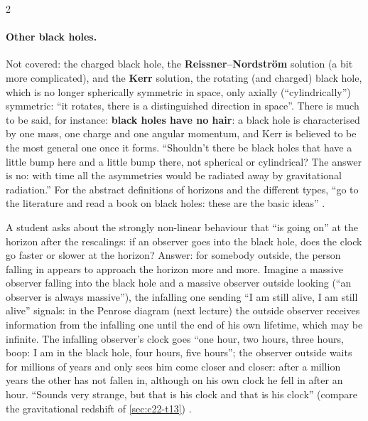 \begin{paracol}{2}
\paragraph{Other black holes.} Not covered: the charged black hole, the \textbf{Reissner--Nordstr\"om} solution (a bit more complicated), and the \textbf{Kerr} solution, the rotating (and charged) black hole, which is no longer spherically symmetric in space, only axially (``cylindrically'') symmetric: ``it rotates, there is a distinguished direction in space''. There is much to be said, for instance: \textbf{black holes have no hair}: a black hole is characterised by one mass, one charge and one angular momentum, and Kerr is believed to be the most general one once it forms. ``Shouldn't there be black holes that have a little bump here and a little bump there, not spherical or cylindrical? The answer is no: with time all the asymmetries would be radiated away by gravitational radiation.'' For the abstract definitions of horizons and the different types, ``go to the literature and read a book on black holes: these are the basic ideas'' .

\begin{coursenote}
A student asks about the strongly non-linear behaviour that ``is going on'' at the horizon after the rescalings: if an observer goes into the black hole, does the clock go faster or slower at the horizon? Answer: for somebody outside, the person falling in appears to approach the horizon more and more. Imagine a massive observer falling into the black hole and a massive observer outside looking (``an observer is always massive''), the infalling one sending ``I am still alive, I am still alive'' signals: in the Penrose diagram (next lecture) the outside observer receives information from the infalling one until the end of his own lifetime, which may be infinite. The infalling observer's clock goes ``one hour, two hours, three hours, boop: I am in the black hole, four hours, five hours''; the observer outside waits for millions of years and only sees him come closer and closer: after a million years the other has not fallen in, although on his own clock he fell in after an hour. ``Sounds very strange, but that is his clock and that is his clock'' (compare the gravitational redshift of \cref{sec:c22-t13}) .
\end{coursenote}


\end{paracol}
